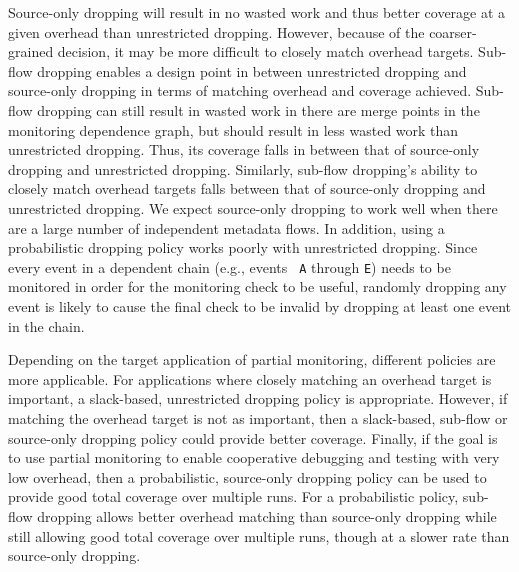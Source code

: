 Source-only dropping will
result in no wasted work and thus better coverage at a given overhead than unrestricted dropping. However, because of the coarser-grained decision, it
may be more difficult to closely match overhead targets. 
Sub-flow dropping enables a design point in between unrestricted dropping and
source-only dropping in terms of matching overhead and coverage achieved.
Sub-flow dropping can still result in wasted work in there are merge points in
the monitoring dependence graph, but should result in less wasted work than
unrestricted dropping. Thus, its coverage falls in between that of source-only dropping and unrestricted dropping. Similarly, sub-flow dropping's ability to closely match overhead targets falls between that of source-only dropping and unrestricted dropping.
We expect source-only dropping 
to work well when there are a large number of independent metadata flows.
In addition, using a probabilistic dropping policy works poorly with
unrestricted dropping. Since every event in a dependent chain (e.g., events {\tt
A} through {\tt E}) needs to be monitored in order for the monitoring check to
be useful, randomly dropping any event is likely to cause the final check to be
invalid by dropping at least one event in the chain.

Depending on the target application of partial monitoring, different policies
are more applicable.
For applications where closely matching an overhead target is important, a
slack-based, unrestricted dropping policy is appropriate. However, if matching
the overhead target is not as important, then a slack-based, sub-flow or source-only dropping
policy could provide better coverage. 
Finally, if the goal is to use partial monitoring to enable cooperative
debugging and testing with very low overhead, then a probabilistic,
source-only dropping policy can be used to provide good total coverage over
multiple runs.
For a probabilistic policy, sub-flow dropping allows better overhead matching than source-only dropping
while still allowing good total coverage over multiple runs, though at a slower
rate than source-only dropping.

